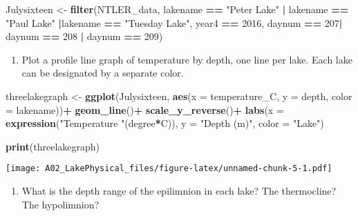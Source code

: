 \documentclass[]{article}
\newenvironment{Shaded}{\begin{snugshade}}{\end{snugshade}}
\newcommand{\DataTypeTok}[1]{\textcolor[rgb]{0.13,0.29,0.53}{#1}}
\newcommand{\DecValTok}[1]{\textcolor[rgb]{0.00,0.00,0.81}{#1}}
\newcommand{\KeywordTok}[1]{\textcolor[rgb]{0.13,0.29,0.53}{\textbf{#1}}}
\newcommand{\NormalTok}[1]{#1}
\newcommand{\OperatorTok}[1]{\textcolor[rgb]{0.81,0.36,0.00}{\textbf{#1}}}
\newcommand{\StringTok}[1]{\textcolor[rgb]{0.31,0.60,0.02}{#1}}
\providecommand{\tightlist}{%
  \setlength{\itemsep}{0pt}\setlength{\parskip}{0pt}}
\begin{document}
\begin{Shaded}
\begin{Highlighting}[]
\NormalTok{Julysixteen <-}\StringTok{ }\KeywordTok{filter}\NormalTok{(NTLER_data, }
\NormalTok{              lakename }\OperatorTok{==}\StringTok{ "Peter Lake"} \OperatorTok{|}\StringTok{ }\NormalTok{lakename }\OperatorTok{==}\StringTok{ "Paul Lake"} \OperatorTok{|}\NormalTok{lakename }\OperatorTok{==}\StringTok{ "Tuesday Lake"}\NormalTok{,}
\NormalTok{              year4 }\OperatorTok{==}\StringTok{ }\DecValTok{2016}\NormalTok{, daynum }\OperatorTok{==}\StringTok{ }\DecValTok{207}\OperatorTok{|}\StringTok{ }\NormalTok{daynum }\OperatorTok{==}\StringTok{ }\DecValTok{208} \OperatorTok{|}\StringTok{ }\NormalTok{daynum }\OperatorTok{==}\StringTok{ }\DecValTok{209}\NormalTok{)}
\end{Highlighting}
\end{Shaded}

\begin{enumerate}
\def\labelenumi{\arabic{enumi}.}
\setcounter{enumi}{8}
\tightlist
\item
  Plot a profile line graph of temperature by depth, one line per lake.
  Each lake can be designated by a separate color.
\end{enumerate}

\begin{Shaded}
\begin{Highlighting}[]
\NormalTok{threelakegraph <-}\StringTok{ }\KeywordTok{ggplot}\NormalTok{(Julysixteen, }\KeywordTok{aes}\NormalTok{(}\DataTypeTok{x =}\NormalTok{ temperature_C, }\DataTypeTok{y =}\NormalTok{ depth, }\DataTypeTok{color =}\NormalTok{ lakename))}\OperatorTok{+}
\StringTok{  }\KeywordTok{geom_line}\NormalTok{()}\OperatorTok{+}
\StringTok{  }\KeywordTok{scale_y_reverse}\NormalTok{()}\OperatorTok{+}
\StringTok{   }\KeywordTok{labs}\NormalTok{(}\DataTypeTok{x =} \KeywordTok{expression}\NormalTok{(}\StringTok{"Temperature "}\NormalTok{(degree}\OperatorTok{*}\NormalTok{C)), }\DataTypeTok{y =} \StringTok{"Depth (m)"}\NormalTok{, }\DataTypeTok{color =} \StringTok{"Lake"}\NormalTok{)}

\KeywordTok{print}\NormalTok{(threelakegraph)}
\end{Highlighting}
\end{Shaded}

\texttt{[image: A02\_LakePhysical\_files/figure-latex/unnamed-chunk-5-1.pdf]}

\begin{enumerate}
\def\labelenumi{\arabic{enumi}.}
\setcounter{enumi}{9}
\tightlist
\item
  What is the depth range of the epilimnion in each lake? The
  thermocline? The hypolimnion?
\end{enumerate}
\end{document}
